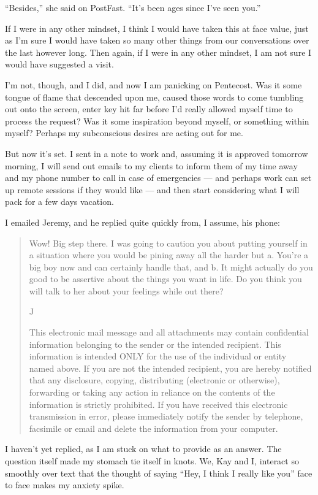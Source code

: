 ``Besides,'' she said on PostFast. ``It's been ages since I've seen you.''

If I were in any other mindset, I think I would have taken this at face value, just as I'm sure I would have taken so many other things from our conversations over the last however long. Then again, if I were in any other mindset, I am not sure I would have suggested a visit.

I'm not, though, and I did, and now I am panicking on Pentecost. Was it some tongue of flame that descended upon me, caused those words to come tumbling out onto the screen, enter key hit far before I'd really allowed myself time to process the request? Was it some inspiration beyond myself, or something within myself? Perhaps my subconscious desires are acting out for me.

But now it's set. I sent in a note to work and, assuming it is approved tomorrow morning, I will send out emails to my clients to inform them of my time away and my phone number to call in case of emergencies --- and perhaps work can set up remote sessions if they would like --- and then start considering what I will pack for a few days vacation.

I emailed Jeremy, and he replied quite quickly from, I assume, his phone:

\begin{quote}
Wow! Big step there. I was going to caution you about putting yourself in a situation where you would be pining away all the harder but a. You're a big boy now and can certainly handle that, and b. It might actually do you good to be assertive about the things you want in life. Do you think you will talk to her about your feelings while out there?

J

This electronic mail message and all attachments may contain confidential information belonging to the sender or the intended recipient. This information is intended ONLY for the use of the individual or entity named above. If you are not the intended recipient, you are hereby notified that any disclosure, copying, distributing (electronic or otherwise), forwarding or taking any action in reliance on the contents of the information is strictly prohibited. If you have received this electronic transmission in error, please immediately notify the sender by telephone, facsimile or email and delete the information from your computer.
\end{quote}

I haven't yet replied, as I am stuck on what to provide as an answer. The question itself made my stomach tie itself in knots. We, Kay and I, interact so smoothly over text that the thought of saying ``Hey, I think I really like you'' face to face makes my anxiety spike.

